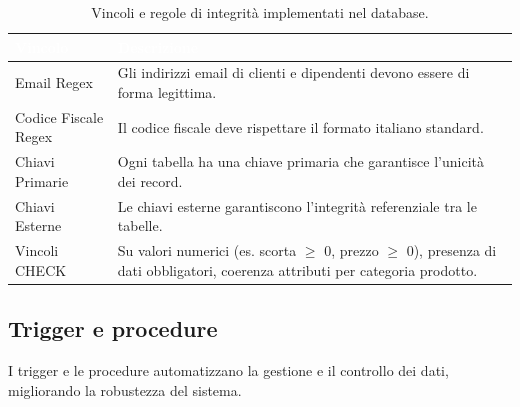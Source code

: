 \documentclass[a4paper,12pt]{article}
\begin{document}
\renewcommand{\arraystretch}{1.3}
\begin{table}[ht]
\centering
\setlength{\tabcolsep}{8pt}
\begin{tabular}{|>{\centering\arraybackslash}m{4cm}|>{\raggedright\arraybackslash}m{10cm}|}
\hline
\rowcolor{myblue}\textcolor{white}{\textbf{Vincolo}} & \textcolor{white}{\textbf{Descrizione}} \\
\hline
\rowcolor{mygray} Email Regex & Gli indirizzi email di clienti e dipendenti devono essere di forma legittima. \\
Codice Fiscale Regex & Il codice fiscale deve rispettare il formato italiano standard. \\
\rowcolor{mygray} Chiavi Primarie & Ogni tabella ha una chiave primaria che garantisce l’unicità dei record. \\
Chiavi Esterne & Le chiavi esterne garantiscono l’integrità referenziale tra le tabelle. \\
\rowcolor{mygray} Vincoli CHECK & Su valori numerici (es. scorta $\geq$ 0, prezzo $\geq$ 0), presenza di dati obbligatori, coerenza attributi per categoria prodotto. \\
\hline
\end{tabular}
\caption{Vincoli e regole di integrità implementati nel database.}
\end{table}

\vspace{1.5em}
\subsection{Trigger e procedure}
\noindent
I trigger e le procedure automatizzano la gestione e il controllo dei dati, migliorando la robustezza del sistema.
\end{document}
